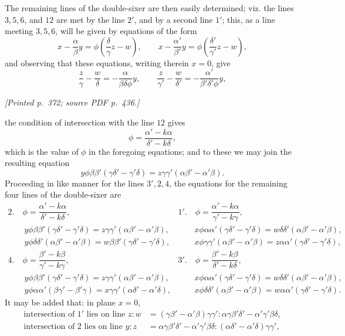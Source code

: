 \documentclass[11pt,a4paper]{article}
\newcommand{\sourcepage}[2]{\par\smallskip\noindent\textit{[Printed p.~#1; source PDF p.~#2.]}\par\smallskip}
\begin{document}
The remaining lines of the double-sixer are then easily determined; viz. the lines
$3,5,6$, and $12$ are met by the line $2'$, and by a second line $1'$; this, as a line
meeting $3,5,6$, will be given by equations of the form
\[
x-\frac{\alpha}{\beta}y=\phi\left(\frac{\delta}{\gamma}z-w\right),\qquad
x-\frac{\alpha'}{\beta'}y=\phi\left(\frac{\delta'}{\gamma'}z-w\right),
\]
and observing that these equations, writing therein $x=0$, give
\[
\frac{z}{\gamma}-\frac{w}{\delta}=-\frac{\alpha}{\beta\delta\phi}y,\qquad
\frac{z}{\gamma'}-\frac{w}{\delta'}=-\frac{\alpha'}{\beta'\delta'\phi}y,
\]

\sourcepage{372}{436}
\noindent
the condition of intersection with the line $12$ gives
\[
\phi=\frac{\alpha'-k\alpha}{\delta'-k\delta},
\]
which is the value of $\phi$ in the foregoing equations; and to these we may join the
resulting equation
\[
y\phi\beta\beta'(\gamma\delta'-\gamma'\delta)=
z\gamma\gamma'(\alpha\beta'-\alpha'\beta).
\]
Proceeding in like manner for the lines $3',2,4$, the equations for the remaining
four lines of the double-sixer are
\[
\begin{array}{ll}
2.\quad \phi=\dfrac{\alpha'-k\alpha}{\delta'-k\delta},&
1'.\quad \phi=\dfrac{\alpha'-k\alpha}{\gamma'-k\gamma},\\[2mm]
\qquad y\phi\beta\beta'(\gamma\delta'-\gamma'\delta)=
z\gamma\gamma'(\alpha\beta'-\alpha'\beta),&
\qquad x\phi\alpha\alpha'(\gamma\delta'-\gamma'\delta)=
w\delta\delta'(\alpha\beta'-\alpha'\beta),\\[2mm]
\qquad y\phi\delta\delta'(\alpha\beta'-\alpha'\beta)=
w\beta\beta'(\gamma\delta'-\gamma'\delta),&
\qquad x\phi\gamma\gamma'(\alpha\beta'-\alpha'\beta)=
z\alpha\alpha'(\gamma\delta'-\gamma'\delta),\\[3mm]
4.\quad \phi=\dfrac{\beta'-k\beta}{\gamma'-k\gamma},&
3'.\quad \phi=\dfrac{\beta'-k\beta}{\delta'-k\delta},\\[2mm]
\qquad y\phi\beta\beta'(\gamma\delta'-\gamma'\delta)=
z\gamma\gamma'(\alpha\beta'-\alpha'\beta),&
\qquad x\phi\alpha\alpha'(\gamma\delta'-\gamma'\delta)=
w\delta\delta'(\alpha\beta'-\alpha'\beta),\\[2mm]
\qquad y\phi\alpha\alpha'(\beta\gamma'-\beta'\gamma)=
x\gamma\gamma'(\alpha\delta'-\alpha'\delta),&
\qquad x\phi\delta\delta'(\alpha\beta'-\alpha'\beta)=
w\alpha\alpha'(\gamma\delta'-\gamma'\delta).
\end{array}
\]
It may be added that: in plane $x=0$,
\[
\begin{array}{rl}
\text{intersection of }1' \text{ lies on line } z:w
  &= (\gamma\beta'-\alpha'\beta)\gamma\gamma' :
     \alpha\gamma\beta'\delta'-\alpha'\gamma'\beta\delta,\\
\text{intersection of }2 \text{ lies on line } y:z
  &= \alpha\gamma\beta'\delta'-\alpha'\gamma'\beta\delta :
     (\alpha\delta'-\alpha'\delta)\gamma\gamma',
\end{array}
\]
\end{document}
